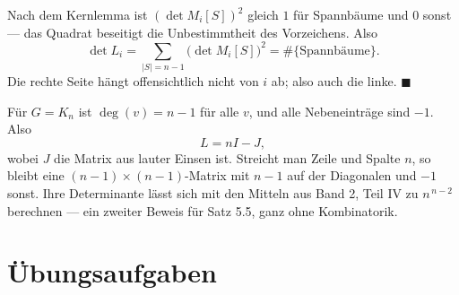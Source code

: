 \begin{merksatz}
Nach dem Kernlemma ist $(\det M_i[S])^2$ gleich $1$ für Spannbäume und $0$ sonst --- das Quadrat beseitigt die Unbestimmtheit des Vorzeichens. Also
\[ \det L_i = \sum_{|S| = n-1} \bigl(\det M_i[S]\bigr)^2 = \#\{\text{Spannbäume}\} . \]
Die rechte Seite hängt offensichtlich nicht von $i$ ab; also auch die linke. $\blacksquare$
\end{merksatz}

\begin{merksatz}
Für $G = K_n$ ist $\deg(v) = n-1$ für alle $v$, und alle Nebeneinträge sind $-1$. Also
\[ L = n I - J, \]
wobei $J$ die Matrix aus lauter Einsen ist. Streicht man Zeile und Spalte $n$, so bleibt eine $(n-1)\times(n-1)$-Matrix mit $n-1$ auf der Diagonalen und $-1$ sonst. Ihre Determinante lässt sich mit den Mitteln aus Band 2, Teil IV zu $n^{\,n-2}$ berechnen --- ein zweiter Beweis für Satz 5.5, ganz ohne Kombinatorik.

\begin{center}
\begin{minipage}{0.88\textwidth}
\end{minipage}
\end{center}
\end{merksatz}

\section{Übungsaufgaben}

